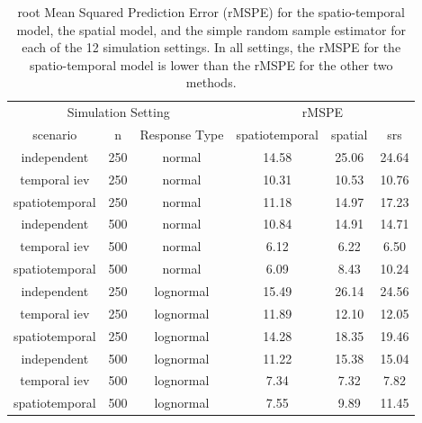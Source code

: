 \documentclass[]{interact}
\theoremstyle{plain}%
\theoremstyle{definition}
\theoremstyle{remark}
\begin{document}
\begin{table}[H]

\caption{\label{tab:simrmspetab}root Mean Squared Prediction Error (rMSPE) for the spatio-temporal model, the spatial model, and the simple random sample estimator for each of the 12 simulation settings. In all settings, the rMSPE for the spatio-temporal model is lower than the rMSPE for the other two methods.}
\centering
\begin{tabular}[t]{cccccc}
\toprule
\multicolumn{3}{c}{Simulation Setting} & \multicolumn{3}{c}{rMSPE} \\
\cmidrule(l{3pt}r{3pt}){1-3} \cmidrule(l{3pt}r{3pt}){4-6}
scenario & n & Response Type & spatiotemporal & spatial & srs\\
\midrule
independent & 250 & normal & 14.58 & 25.06 & 24.64\\
temporal iev & 250 & normal & 10.31 & 10.53 & 10.76\\
spatiotemporal & 250 & normal & 11.18 & 14.97 & 17.23\\
\midrule
independent & 500 & normal & 10.84 & 14.91 & 14.71\\
temporal iev & 500 & normal & 6.12 & 6.22 & 6.50\\
spatiotemporal & 500 & normal & 6.09 & 8.43 & 10.24\\
\midrule
independent & 250 & lognormal & 15.49 & 26.14 & 24.56\\
temporal iev & 250 & lognormal & 11.89 & 12.10 & 12.05\\
spatiotemporal & 250 & lognormal & 14.28 & 18.35 & 19.46\\
\midrule
independent & 500 & lognormal & 11.22 & 15.38 & 15.04\\
temporal iev & 500 & lognormal & 7.34 & 7.32 & 7.82\\
spatiotemporal & 500 & lognormal & 7.55 & 9.89 & 11.45\\
\bottomrule
\end{tabular}
\end{table}
\end{document}

